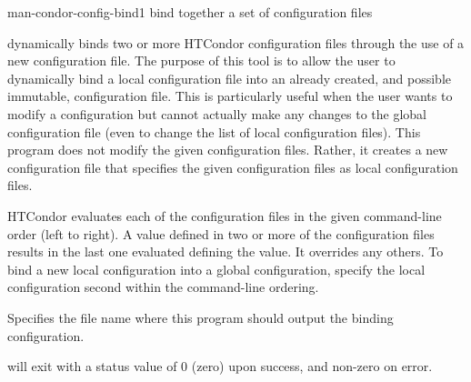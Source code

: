 \begin{ManPage}{}{man-condor-config-bind}{1}
{bind together a set of configuration files}


\Synopsis {}


\Description

 dynamically binds two or more HTCondor
configuration files through the use of a new configuration file.  The
purpose of this tool is to allow the user to dynamically bind a local
configuration file into an already created, and possible immutable,
configuration file.  This is particularly useful when the user wants to
modify a configuration but cannot actually make any changes to the
global configuration file (even to change the list of local configuration
files).  This program does not modify the given configuration files.
Rather, it creates a new configuration file that specifies the given
configuration files as local configuration files.  

HTCondor evaluates each of the configuration files in the given
command-line order (left to right).
A value defined 
in two or more of the configuration files results in
the last one evaluated defining the value. It overrides any others.
To bind a new local configuration into a global configuration, 
specify the local configuration second within the command-line
ordering.

\begin{Options}
   {
    Specifies the file name where this program should output the
    binding configuration. 
  }
\end{Options}

\ExitStatus

 will exit with a status value of 0 (zero) upon
success, and non-zero on error.

\end{ManPage}
